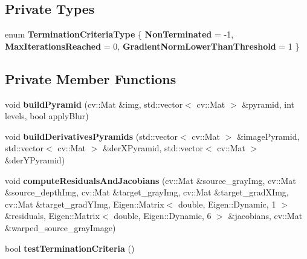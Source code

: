 \subsection*{Private Types}
\begin{DoxyCompactItemize}
\item 
enum {\bfseries TerminationCriteriaType} \{ {\bfseries NonTerminated} =  -\/1, 
{\bfseries MaxIterationsReached} =  0, 
{\bfseries GradientNormLowerThanThreshold} =  1
 \}
\end{DoxyCompactItemize}
\subsection*{Private Member Functions}
\begin{DoxyCompactItemize}
\item 
\hypertarget{class_photoconsistency_odometry_1_1_analytic_1_1_c_photoconsistency_odometry_analytic_added156167e70927ad08b8c5f167aa7c}{
void {\bfseries buildPyramid} (cv::Mat \&img, std::vector$<$ cv::Mat $>$ \&pyramid, int levels, bool applyBlur)}
\label{class_photoconsistency_odometry_1_1_analytic_1_1_c_photoconsistency_odometry_analytic_added156167e70927ad08b8c5f167aa7c}

\item 
\hypertarget{class_photoconsistency_odometry_1_1_analytic_1_1_c_photoconsistency_odometry_analytic_a98cd69b765d58e68fb83d53e0a45944b}{
void {\bfseries buildDerivativesPyramids} (std::vector$<$ cv::Mat $>$ \&imagePyramid, std::vector$<$ cv::Mat $>$ \&derXPyramid, std::vector$<$ cv::Mat $>$ \&derYPyramid)}
\label{class_photoconsistency_odometry_1_1_analytic_1_1_c_photoconsistency_odometry_analytic_a98cd69b765d58e68fb83d53e0a45944b}

\item 
\hypertarget{class_photoconsistency_odometry_1_1_analytic_1_1_c_photoconsistency_odometry_analytic_a0de61bdb5fa8cf8840b908aa62bbc7ee}{
void {\bfseries computeResidualsAndJacobians} (cv::Mat \&source\_\-grayImg, cv::Mat \&source\_\-depthImg, cv::Mat \&target\_\-grayImg, cv::Mat \&target\_\-gradXImg, cv::Mat \&target\_\-gradYImg, Eigen::Matrix$<$ double, Eigen::Dynamic, 1 $>$ \&residuals, Eigen::Matrix$<$ double, Eigen::Dynamic, 6 $>$ \&jacobians, cv::Mat \&warped\_\-source\_\-grayImage)}
\label{class_photoconsistency_odometry_1_1_analytic_1_1_c_photoconsistency_odometry_analytic_a0de61bdb5fa8cf8840b908aa62bbc7ee}

\item 
\hypertarget{class_photoconsistency_odometry_1_1_analytic_1_1_c_photoconsistency_odometry_analytic_ae9a8a62f578082c2cba0b3919fa81673}{
bool {\bfseries testTerminationCriteria} ()}
\label{class_photoconsistency_odometry_1_1_analytic_1_1_c_photoconsistency_odometry_analytic_ae9a8a62f578082c2cba0b3919fa81673}

\end{DoxyCompactItemize}
